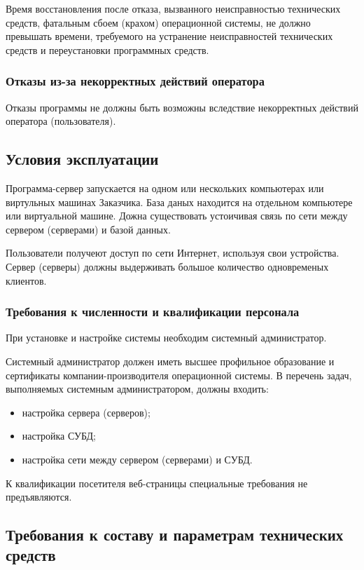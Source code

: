 \documentclass[a4page]{article}
\begin{document}
Время восстановления после отказа, вызванного неисправностью технических средств, фатальным сбоем (крахом) операционной системы, не должно превышать времени, требуемого на устранение неисправностей технических средств и переустановки программных средств.

\subsubsection{Отказы из-за некорректных действий оператора}

Отказы программы не должны быть возможны вследствие некорректных действий оператора (пользователя). 

\subsection{Условия эксплуатации}

Программа-сервер запускается на одном или нескольких компьютерах или виртульных машинах Заказчика. База даных находится на отдельном компьютере или виртуальной машине. Дожна существовать устоичивая связь по сети между сервером (серверами) и базой данных.

Пользователи получеют доступ по сети Интернет, используя свои устройства. Сервер (серверы) должны выдерживать большое количество одновременых клиентов.

\subsubsection{Требования к численности и квалификации персонала}

При установке и настройке системы необходим системный администратор.

Системный администратор должен иметь высшее профильное образование и сертификаты компании-производителя операционной системы. В перечень задач, выполняемых системным администратором, должны входить:

\begin{itemize}
  \item настройка сервера (серверов);
  \item настройка СУБД;
  \item настройка сети между сервером (серверами) и СУБД.
\end{itemize}

К квалификации посетителя веб-страницы специальные требования не предъявляются.

\subsection{Требования к составу и параметрам технических средств}
\end{document}
